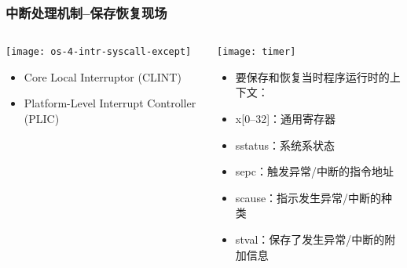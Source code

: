 \begin{frame}[plain,t]
	\frametitle{中断处理机制--保存恢复现场}
	\begin{columns}
		
		\begin{column}{0.4\textwidth}
			\centering
			\texttt{[image: os-4-intr-syscall-except]}
			\begin{itemize} \small
				\item Core Local	Interruptor (CLINT)
				\item Platform-Level Interrupt Controller (PLIC)
			\end{itemize}
			
		\end{column}
		
		\begin{column}{0.5\textwidth}
			
			\centering
			
			\texttt{[image: timer]}
			
			\begin{itemize} \small 
				\item 要保存和恢复当时程序运行时的上下文：\pause
				\item x[0--32]：通用寄存器 \pause
				\item sstatus：系统系状态
				\item sepc：触发异常/中断的指令地址
				\item scause：指示发生异常/中断的种类
				\item stval：保存了发生异常/中断的附加信息
			\end{itemize}
			
		\end{column}
		
	\end{columns}
	
\end{frame}


